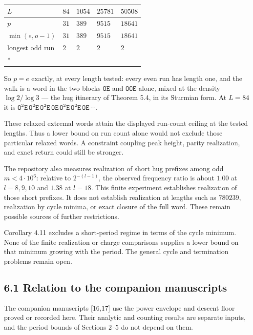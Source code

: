 \documentclass[12pt]{article}
\begin{document}
\begingroup\small

\begin{longtable}[]{@{}lllll@{}}
\toprule\noalign{}
\(L\) & \(84\) & \(1054\) & \(25781\) & \(50508\) \\
\midrule\noalign{}
\endhead
\bottomrule\noalign{}
\endfoot
\bottomrule\noalign{}
\endlastfoot
\(p\) & \(31\) & \(389\) & \(9515\) & \(18641\) \\
\(\min(e,o-1)\) & \(31\) & \(389\) & \(9515\) & \(18641\) \\
longest odd run & \(2\) & \(2\) & \(2\) & \(2\) \\*
\end{longtable}

\endgroup

So \(p=e\) exactly, at every length tested: every even run has length
one, and the walk is a word in the two blocks \(\mathtt{OE}\) and
\(\mathtt{OOE}\) alone, mixed at the density \(\log2/\log3\) --- the hug
itinerary of Theorem 5.4, in its Sturmian form. At \(L=84\) it is
\(\mathtt{O^2E\,O^2E\,O^2E\,OE\,O^2E\,O^2E\,OE\,\cdots}\).

These relaxed extremal words attain the displayed run-count ceiling at
the tested lengths. Thus a lower bound on run count alone would not
exclude those particular relaxed words. A constraint coupling peak
height, parity realization, and exact return could still be stronger.

The repository also measures realization of short hug prefixes among odd
\(m<4\cdot10^6\): relative to \(2^{-(l-1)}\), the observed frequency
ratio is about \(1.00\) at \(l=8,9,10\) and \(1.38\) at \(l=18\). This
finite experiment establishes realization of those short prefixes. It
does not establish realization at lengths such as \(780239\),
realization by cycle minima, or exact closure of the full word. These
remain possible sources of further restrictions.

Corollary 4.11 excludes a short-period regime in terms of the cycle
minimum. None of the finite realization or charge comparisons supplies a
lower bound on that minimum growing with the period. The general cycle
and termination problems remain open.

\subsection{6.1 Relation to the companion
manuscripts}\label{relation-to-the-companion-manuscripts}

The companion manuscripts {[}16,17{]} use the power envelope and descent
floor proved or recorded here. Their analytic and counting results are
separate inputs, and the period bounds of Sections 2--5 do not depend on
them.
\end{document}
